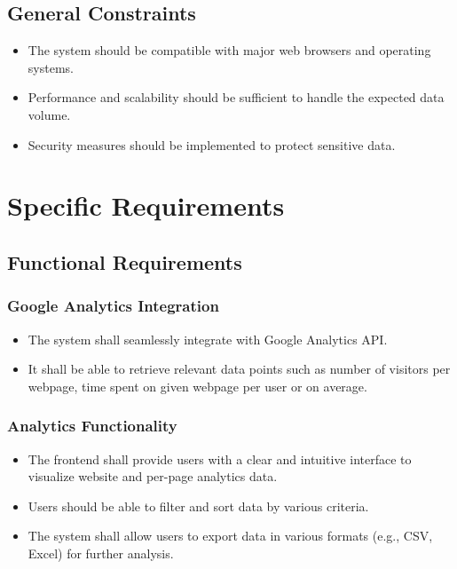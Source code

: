 \documentclass[12pt]{article}
\begin{document}
\subsection{General Constraints}
\begin{itemize}
    \item The system should be compatible with major web browsers and operating systems.
    \item Performance and scalability should be sufficient to handle the expected data volume.
    \item Security measures should be implemented to protect sensitive data.
\end{itemize}

\section{Specific Requirements}
\subsection{Functional Requirements}

\subsubsection{Google Analytics Integration}
\begin{itemize}
    \item The system shall seamlessly integrate with Google Analytics API.
    \item It shall be able to retrieve relevant data points such as number of visitors per webpage, time spent on given webpage per user or on average.
\end{itemize}

\subsubsection{Analytics Functionality}
\begin{itemize}
    \item The frontend shall provide users with a clear and intuitive interface to visualize website and per-page analytics data.
    \item Users should be able to filter and sort data by various criteria.
    \item The system shall allow users to export data in various formats (e.g., CSV, Excel) for further analysis.
\end{itemize}
\end{document}
